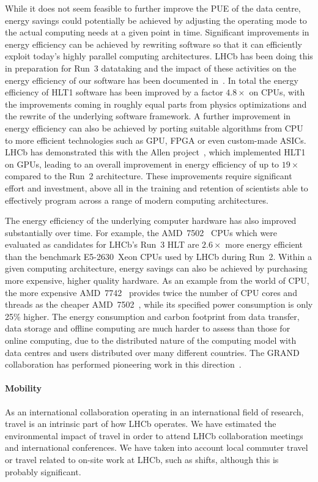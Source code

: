 \documentclass[../SustainableHEP.tex]{subfiles}
\begin{document}
\begin{casestudy}
While it does not seem feasible to further improve the PUE of the data centre, energy savings could potentially be achieved by adjusting the operating mode to the actual computing needs at a given point in time.  Significant improvements in energy efficiency can be achieved by rewriting software so that it can efficiently exploit today's highly parallel computing architectures. LHCb has been doing this in preparation for Run~3 datataking and the impact of these activities on the energy efficiency of our software has been documented in~\cite{hlt1-energy-eff}. In total the energy efficiency of HLT1 software has been improved by a factor $4.8\times$ on CPUs, with the improvements coming in roughly equal parts from physics optimizations and the rewrite of the underlying software framework. A further improvement in energy efficiency  can also be achieved by porting suitable algorithms from CPU to more efficient technologies such as GPU, FPGA or even custom-made ASICs. LHCb has demonstrated this with the Allen project~\cite{Allen}, which implemented HLT1 on GPUs, leading to an overall improvement in energy efficiency of up to $19\times$ compared to the Run~2 architecture. These improvements require significant effort and investment, above all in the training and retention of scientists able to effectively program across a range of modern computing architectures. 

The energy efficiency of the underlying computer hardware has also improved substantially over time. For example, the
AMD~7502~\cite{AMD7502} CPUs which were evaluated as candidates for LHCb's Run~3 HLT are $2.6\times$ more energy efficient than 
the benchmark E5-2630~Xeon CPUs used by LHCb during Run~2. 
Within a given computing architecture, energy savings can also be achieved by purchasing more expensive, higher quality hardware. 
As an example from the world of CPU, the more expensive AMD~7742~\cite{AMD7742}
provides twice the number of CPU cores and threads as the cheaper AMD~7502~\cite{AMD7502},
while its specified power consumption is only 25\% higher. The energy consumption and carbon footprint from data transfer, data storage and offline computing are much harder to assess than those for online computing, due to the distributed nature of the computing model with data centres and users distributed over many different countries. The GRAND collaboration has performed pioneering work in this direction~\cite{GRAND}.

\paragraph{Mobility}
As an international collaboration operating in an international field of research, travel is an intrinsic part of how LHCb operates. We have estimated the environmental impact of travel in order to attend LHCb collaboration meetings and international conferences. We have taken into account local commuter travel or travel related to on-site work at LHCb, such as shifts, although this is probably significant.


\end{casestudy}
\end{document}

